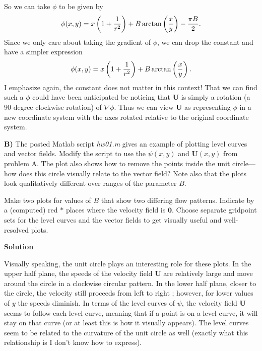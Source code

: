 \documentclass{article}
\def\*#1{\mathbf{#1}}
\begin{document}
%
So we can take $\phi$ to be given by
%
\begin{equation*}
    \phi(x, y) = x \del{1 + \frac{1}{r^2}} + B \arctan \del{\frac{x}{y}} - \frac{\pi B}{2}
    .
\end{equation*}
%
Since we only care about taking the gradient of $\phi$, we can drop the
constant and have a simpler expression
%
\begin{equation*}
    \phi(x, y) = x \del{1 + \frac{1}{r^2}} + B \arctan \del{\frac{x}{y}}
    .
\end{equation*}
%
I emphasize again, the constant does not matter in this context! That we
can find such a $\phi$ could have been anticipated be noticing that
$\*U$ is simply a rotation (a 90-degree clockwise rotation) of $\nabla
\phi$. Thus we can view $\*U$ as representing $\phi$ in a new coordinate
system with the axes rotated relative to the original coordinate system.

\newpage

\textbf{B)} The posted Matlab script \textit{hw01.m} gives an example of
plotting level curves and vector fields. Modify the script to use the
$\psi(x, y)$ and $\*U(x, y)$ from problem A. The plot also
shows how to remove the points inside the unit circle---how does this
circle visually relate to the vector field? Note also that the plots
look qualitatively different over ranges of the parameter $B$.

Make two plots for values of $B$ that show two differing flow patterns.
Indicate by a (computed) red $\ast$ places where the velocity field is
$\*0$. Choose separate gridpoint sets for the level curves and the
vector fields to get visually useful and well-resolved plots.

\textbf{Solution}

Visually speaking, the unit circle plays an interesting role for these
plots. In the upper half plane, the speeds of the velocity field $\*U$
are relatively large and move around the circle in a clockwise circular
pattern. In the lower half plane, closer to the circle, the velocity
still proceeds from left to right ; however, for lower values of $y$ the
speeds diminish. In terms of the level curves of $\psi$, the velocity
field $\*U$ seems to follow each level curve, meaning that if a point is
on a level curve, it will stay on that curve (or at least this is how it
visually appears). The level curves seem to be related to the curvature
of the unit circle as well (exactly what this relationship is I don't
know how to express).
\end{document}
